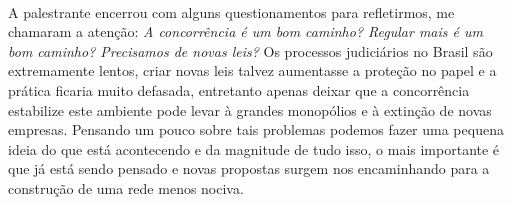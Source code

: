 \documentclass[12pt]{article}
\begin{document}
	\paragraph{}
		A palestrante encerrou com alguns questionamentos para refletirmos,
		me chamaram a atenção: \textit{A concorrência é um bom caminho?
		Regular mais é um bom caminho? Precisamos de novas leis?}
		Os processos judiciários no Brasil são extremamente lentos, criar novas
		leis talvez aumentasse a proteção no papel e a prática ficaria muito 
		defasada, entretanto apenas deixar que a concorrência estabilize este
		ambiente pode levar à grandes monopólios e à extinção de novas empresas.
		Pensando um pouco sobre tais problemas podemos fazer uma pequena ideia
		do que está acontecendo e da magnitude de tudo isso, o mais importante é que
		já está sendo pensado e novas propostas surgem nos encaminhando para
		a construção de uma rede menos nociva.				
\end{document}
